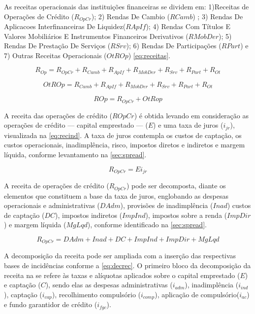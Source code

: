 \documentclass[
  12pt,
  12pt,
  openright,
  oneside,
  a4paper,
  chapter=TITLE,
  section=TITLE,
  subsection=TITLE,
  subsubsection=TITLE,
  english,
  portugues,
  sumario=tradicional]{abntex2}
\begin{document}
\begin{apendicesenv}
As receitas operacionais das instituições financeiras se dividem em: 1)Receitas de Operações de Crédito ($R_{OpCr}$); 2) Rendas De Cambio ($RCamb$) ; 3) Rendas De Aplicacoes Interfinanceiras De Liquidez($RApIf$); 4) Rendas Com Títulos E Valores Mobiliários E Instrumentos Financeiros Derivativos ($RMobDer$); 5) Rendas De Prestação De Serviços ($RSrv$); 6) Rendas De Participações ($RPart$) e 7) Outras Receitas Operacionais ($OtROp$) \autoref{eq:receitas}.


\begin{equation}\label{eq:receitas}
R_{Op} = R_{OpCr} + R_{Camb} + R_{ApIf} + R_{MobDer} + R_{Srv} + R_{Part} + R_{Ot}
\end{equation}




\begin{equation}
OtROp = R_{Camb} + R_{ApIf} + R_{MobDer} + R_{Srv} + R_{Part} + R_{Ot} 
\end{equation}



\begin{equation}
ROp = R_{OpCr} + OtRop
\end{equation}


A receita das operações de crédito ($ROpCr$) é obtida levando em  consideração as operações de crédito — capital emprestado — ($E$) e uma taxa de juros ($i_{jr}$), visualizada na \autoref{eq:recind}. A taxa de juros contempla os custos de captação, os custos operacionais, inadimplência, risco, impostos diretos e indiretos e margem líquida, conforme levantamento na \autoref{sec:spread}.


\begin{equation}\label{eq:recind}
R_{OpCr} = Ei_{jr}
\end{equation}


A receita de operações de crédito ($R_{OpCr}$) pode ser decomposta, diante os elementos que constituem a base da taxa de juros,  englobando as despesas operacionais e administrativas ($DAdm$), provisões de inadimplência ($Inad$) custos de captação ($DC$), impostos indiretos ($ImpInd$), impostos sobre a renda ($ImpDir$) e margem líquida ($MgLqd$), conforme identificado na \autoref{sec:spread}.


\begin{equation}
R_{OpCr} = DAdm + Inad + DC + ImpInd + ImpDir + MgLqd
\end{equation}


A decomposição da receita pode ser ampliada com a inserção das respectivas bases de incidências conforme a \autoref{eq:decrec}. O primeiro bloco da decomposição da receita na se refere às taxas e alíquotas aplicados sobre o capital emprestado ($E$) e captação ($C$), sendo elas as despesas administrativas ($i_{adm}$), inadimplência ($i_{ind}$), captação ($i_{cap}$), recolhimento compulsório ($i_{comp}$), aplicação de compulsório($i_{ac}$) e fundo garantidor de crédito ($i_{fgc}$).


\end{apendicesenv}
\end{document}
